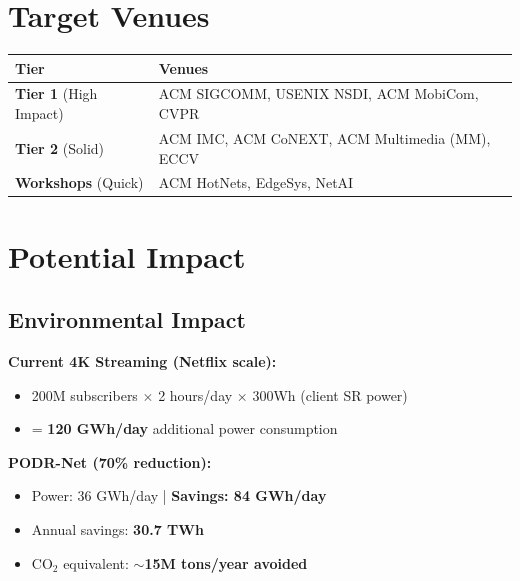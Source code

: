 \documentclass[11pt, a4paper]{article}
\begin{document}
\section{Target Venues}

\begin{table}[H]
\centering
\begin{tabular}{>{\raggedright}p{3.5cm} p{9cm}}
\toprule
\textbf{Tier} & \textbf{Venues} \\
\midrule
\rowcolor{secondarygreen!10} \textcolor{secondarygreen}{\textbf{Tier 1}} (High Impact) & ACM SIGCOMM, USENIX NSDI, ACM MobiCom, CVPR \\
\textbf{Tier 2} (Solid) & ACM IMC, ACM CoNEXT, ACM Multimedia (MM), ECCV \\
\rowcolor{lightbg} \textbf{Workshops} (Quick) & ACM HotNets, EdgeSys, NetAI \\
\bottomrule
\end{tabular}
\end{table}

\section{Potential Impact}

\subsection{Environmental Impact}

\begin{important}
\textbf{Current 4K Streaming (Netflix scale):}
\begin{itemize}[noitemsep]
    \item 200M subscribers $\times$ 2 hours/day $\times$ 300Wh (client SR power)
    \item = \textbf{120 GWh/day} additional power consumption
\end{itemize}

\textbf{PODR-Net (70\% reduction):}
\begin{itemize}[noitemsep]
    \item Power: 36 GWh/day | \textbf{Savings: 84 GWh/day}
    \item Annual savings: \textbf{30.7 TWh}
    \item CO$_2$ equivalent: \textbf{$\sim$15M tons/year avoided}
\end{itemize}
\end{important}
\end{document}
